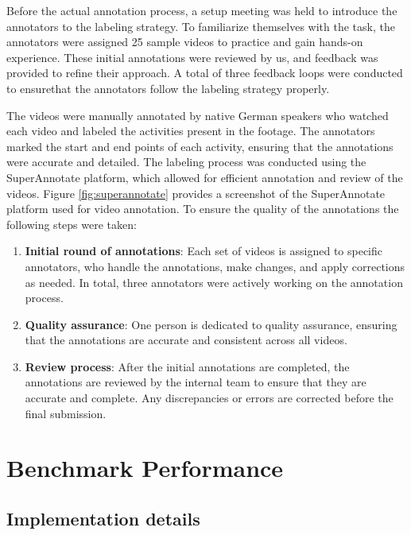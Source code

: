 \documentclass[
  man,floatsintext]{apa6}
\providecommand{\tightlist}{%
  \setlength{\itemsep}{0pt}\setlength{\parskip}{0pt}}
\begin{document}
Before the actual annotation process, a setup meeting was held to introduce the annotators to the labeling strategy. To familiarize themselves with the task, the annotators were assigned 25 sample videos to practice and gain hands-on experience. These initial annotations were reviewed by us, and feedback was provided to refine their approach. A total of three feedback loops were conducted to ensurethat the annotators follow the labeling strategy properly.

The videos were manually annotated by native German speakers who watched each video and labeled the activities present in the footage. The annotators marked the start and end points of each activity, ensuring that the annotations were accurate and detailed. The labeling process was conducted using the SuperAnnotate platform, which allowed for efficient annotation and review of the videos. Figure \ref{fig:superannotate} provides a screenshot of the SuperAnnotate platform used for video annotation. To ensure the quality of the annotations the following steps were taken:

\begin{enumerate}
\def\labelenumi{\arabic{enumi}.}
\tightlist
\item
  \textbf{Initial round of annotations}: Each set of videos is assigned to specific annotators, who handle the annotations, make changes, and apply corrections as needed. In total, three annotators were actively working on the annotation process.
\item
  \textbf{Quality assurance}: One person is dedicated to quality assurance, ensuring that the annotations are accurate and consistent across all videos.
\item
  \textbf{Review process}: After the initial annotations are completed, the annotations are reviewed by the internal team to ensure that they are accurate and complete. Any discrepancies or errors are corrected before the final submission.
\end{enumerate}

\section{Benchmark Performance}\label{benchmark-performance}

\subsection{Implementation details}\label{implementation-details}
\end{document}
